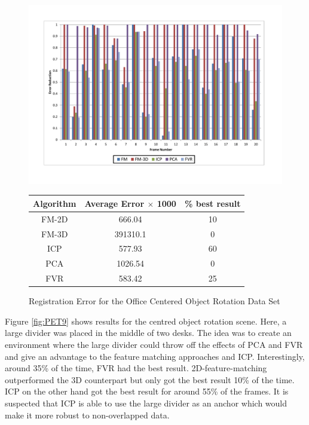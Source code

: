 \begin{figure}
\centering
\includegraphics[width=6in]{images/results/Office_Texture_blind_spot_rotation}
\caption{Registration Error for the Office Centered Object Rotation Data Set}
\label{fig:PET9}

\begin{tabular}{ccc}
\hline
\textbf{Algorithm} & \textbf{Average Error $\times$ 1000} & \textbf{\% best result}\\ \hline
FM-2D	& 666.04 & 10\\
FM-3D	& 391310.1 & 0\\
ICP		& 577.93 & 60\\
PCA		& 1026.54 & 0\\
FVR		& 583.42 & 25\\
\end{tabular}
\label{tab:PET9ST}
\end{figure} 


Figure \ref{fig:PET9} shows results for the centred object rotation scene. Here, a large divider was placed in the middle of two desks. The idea was to create an environment where the large divider could throw off the effects of PCA and FVR and give an advantage to the feature matching approaches and ICP. Interestingly, around 35\% of the time, FVR had the best result. 2D-feature-matching outperformed the 3D counterpart but only got the best result 10\% of the time. ICP on the other hand got the best result for around 55\% of the frames. It is suspected that ICP is able to use the large divider as an anchor which would make it more robust to non-overlapped data.


